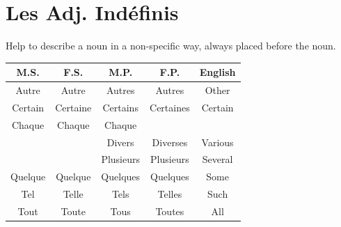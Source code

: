 \documentclass{book}
\begin{document}
\chapter{Les Adj. Indéfinis}
    Help to describe a noun in a non-specific way, always placed before the noun.
    \begin{center}
        \begin{tabular}{|c|c|c|c|c|}
            \hline
            \textbf{M.S.} & \textbf{F.S.} & \textbf{M.P.} & \textbf{F.P.} & \textbf{English} \\
            \hline
            Autre & Autre & Autres & Autres & Other \\
            \hline
            Certain & Certaine & Certains & Certaines & Certain \\
            \hline
            Chaque & Chaque & Chaque & & \\
            \hline
            & & Divers & Diverses & Various \\
            \hline
            & & Plusieurs & Plusieurs & Several \\
            \hline
            Quelque & Quelque & Quelques & Quelques & Some \\
            \hline
            Tel & Telle & Tels & Telles & Such \\
            \hline
            Tout & Toute & Tous & Toutes & All \\
            \hline
        \end{tabular}
    \end{center}
\end{document}
